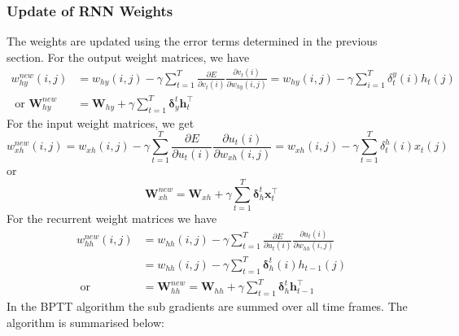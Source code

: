 \subsubsection{Update of RNN Weights}
The weights are updated using the error terms determined in the previous section.  For the output weight matrices, we have \begin{equation}
\begin{aligned}w_{hy}^{new}(i,j)&=w_{hy}(i,j)-\gamma\sum_{t=1}^T\frac{\partial E}{\partial v_t(i)}\frac{\partial v_t(i)}{\partial w_{hy}(i,j)}=w_{hy}(i,j)-\gamma\sum_{i=1}^T\delta_t^y(i)h_t(j)\\ \text{ or }\mathbf{W}_{hy}^{new}&=\mathbf{W}_{hy}+\gamma\sum_{t=1}^T\mathbf{\delta}_y^t\mathbf{h}_t^\top\end{aligned} \label{eqn_c3_bptt10}\end{equation}
For the input weight matrices, we get \begin{equation}
w_{xh}^{new}(i,j)=w_{xh}(i,j)-\gamma\sum_{t=1}^T\frac{\partial E}{\partial u_t(i)}\frac{\partial u_t(i)}{\partial w_{xh}(i,j)}=w_{xh}(i,j)-\gamma\sum_{t=1}^T\delta_t^h(i)x_t(j) \label{eqn_c3_bptt11}\end{equation}
or \begin{equation}
\mathbf{W}_{xh}^{new}=\mathbf{W}_{xh}+\gamma\sum_{t=1}^T\mathbf{\delta}_h^t\mathbf{x}_t^\top \label{eqn_c3_bptt_13}\end{equation}
For the recurrent weight matrices we have 
\begin{equation} \begin{split}w_{hh}^{new}(i,j)&=w_{hh}(i,j)-\gamma\sum_{t=1}^T\frac{\partial E}{\partial u_t(i)}\frac{\partial u_t(i)}{\partial w_{hh}(i,j)}\\ &=w_{hh}(i,j)-\gamma\sum_{t=1}^T\mathbf{\delta}_h^t(i)h_{t-1}(j)\\ \text{ or }&=\mathbf{W}_{hh}^{new}=\mathbf{W}_{hh}+\gamma\sum_{t=1}^T\mathbf{\delta}_h^t\mathbf{h}_{t-1}^\top \end{split} \label{eqn_c3_bptt14}\end{equation}
In the BPTT algorithm the sub gradients are summed over all time frames. The algorithm is summarised below:

